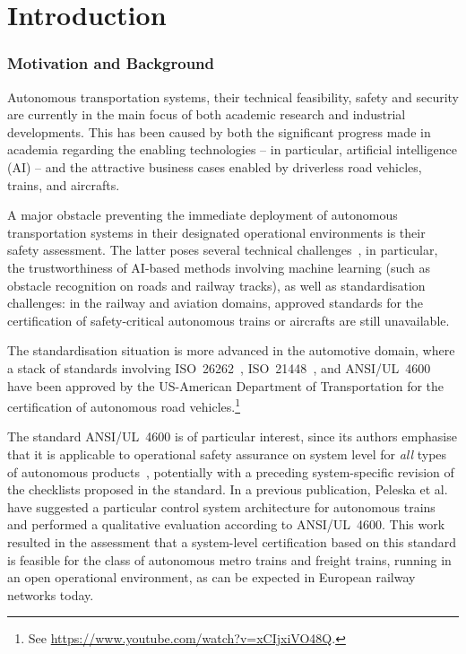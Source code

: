\documentclass[runningheads,a4paper]{llncs}
\begin{document}
\section{Introduction}\label{sec:intro}

\subsubsection*{Motivation and Background}

Autonomous transportation systems, their technical feasibility, safety and security are currently in the main focus of both academic research and industrial developments. This has been caused by both the  significant progress made in academia   regarding the enabling technologies -- in particular, artificial intelligence (AI) --  and   the attractive business cases enabled by driverless road vehicles, trains, and aircrafts. 

A major obstacle preventing the immediate deployment of autonomous transportation systems in their designated operational environments is their safety assessment. The latter poses several technical challenges~\cite{DBLP:journals/itsm/KoopmanW17,RR-1478-RC,10.1145/3542945}, in particular, the trustworthiness of AI-based methods involving machine learning (such as obstacle recognition on roads and railway tracks), as well as standardisation challenges: in the railway and aviation domains, approved standards for the certification of safety-critical autonomous trains or aircrafts are still unavailable.  

The standardisation situation is more advanced in the automotive domain, where a stack of standards involving 
ISO~26262~\cite{iso26262-4},   ISO~21448~\cite{iso21448}, and   ANSI/UL~4600\xspace~\cite{UL4600} have been approved by the US-American Department of Transportation for the certification of autonomous road vehicles.\footnote{See \url{https://www.youtube.com/watch?v=xCIjxiVO48Q}.}

The standard ANSI/UL~4600\xspace is of particular interest, since its authors emphasise that it is applicable to operational safety assurance on system level for {\it all} types of autonomous products~\cite[Section~1.2.1]{UL4600}, 
potentially with a preceding system-specific 
revision of the checklists proposed in the standard. In a previous publication, 
Peleska et al.~\cite{isolapaper2022} have suggested  a particular  control system architecture for autonomous trains and performed   a qualitative evaluation according to 
ANSI/UL~4600\xspace. This work resulted in the assessment that a system-level certification based on  this standard is feasible for the class of autonomous metro trains and freight trains, running in an open  operational environment, as can be expected 
in European railway networks today. 
\end{document}
